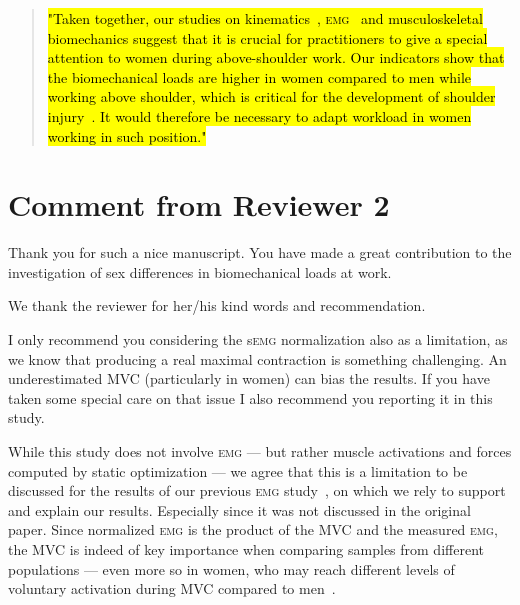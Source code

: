 \documentclass[preprint,review,12pt]{elsarticle}
\begin{document}
    \begin{quote}
        \hl{"Taken together, our studies on kinematics~{\citep{Martinez2019-mm}}, \textsc{emg}~{\citep{Bouffard2019-fd}} and musculoskeletal biomechanics suggest that it is crucial for practitioners to give a special attention to women during above-shoulder work.
        Our indicators show that the biomechanical loads are higher in women compared to men while working above shoulder, which is critical for the development of shoulder injury~{\citep{Van_der_Molen2017-sb}}.
        It would therefore be necessary to adapt workload in women working in such position."}
    \end{quote}

    \section{Comment from Reviewer 2}\label{sec:reviewer-2}

    \begin{formal}
        Thank you for such a nice manuscript.
        You have made a great contribution to the investigation of sex differences in biomechanical loads at work.
    \end{formal}

    We thank the reviewer for her/his kind words and recommendation.

    \begin{formal}
        I only recommend you considering the s\textsc{emg} normalization also as a limitation, as we know that producing a real maximal contraction is something challenging.
        An underestimated MVC (particularly in women) can bias the results.
        If you have taken some special care on that issue I also recommend you reporting it in this study.
    \end{formal}

    While this study does not involve \textsc{emg} --- but rather muscle activations and forces computed by static optimization --- we agree that this is a limitation to be discussed for the results of our previous \textsc{emg} study~\citep{Bouffard2019-fd}, on which we rely to support and explain our results.
    Especially since it was not discussed in the original paper.
    Since normalized \textsc{emg} is the product of the MVC and the measured \textsc{emg}, the MVC is indeed of key importance when comparing samples from different populations --- even more so in women, who may reach different levels of voluntary activation during MVC compared to men~\citep{Ema2018-cd, Inglis2013-uq}.
\end{document}
